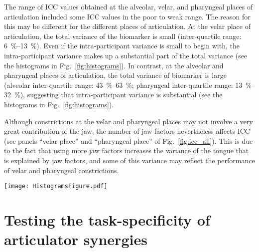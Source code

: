 \documentclass[reprint]{JASAnew}\usepackage[]{graphicx}\usepackage[]{color}
\begin{document}
The range of ICC values obtained at the alveolar, velar, and pharyngeal places of articulation included some ICC values in the poor to weak range. 
%
The reason for this may be different for the different places of articulation. 
%
At the velar place of articulation, the total variance of the biomarker is small
(inter-quartile range: \SIrange{6}{13}{\percent}). 
Even if the intra-participant variance is small to begin with, the intra-participant variance makes up a substantial part of the total variance (see the histograms in Fig.~\ref{fig:histograms}). 
%
In contrast, at the alveolar and pharyngeal places of articulation, the total variance of biomarker is large 
(alveolar inter-quartile range: \SIrange{43}{63}{\percent};
pharyngeal inter-quartile range: \SIrange{13}{32}{\percent}),
suggesting that intra-participant variance is substantial (see the histograms in Fig.~\ref{fig:histograms}). 

Although constrictions at the velar and pharyngeal places may not involve a very great contribution of the jaw, the number of jaw factors nevertheless affects ICC (see panels ``velar place'' and ``pharyngeal place'' of Fig.~\ref{fig:icc_all}). This is due to the fact that using more jaw factors increases the variance of the tongue that is explained by jaw factors, and some of this variance may reflect the performance of velar and pharyngeal constrictions. 


\begin{figure*}[t]

\texttt{[image: HistogramsFigure.pdf]}

\caption{\label{fig:histograms}(color online) 
Sample distribution of the jaw contributions to constrictions at the bilabial, alveolar, palatal, velar, and pharyngeal places of articulation. The quantity plotted is the percent of a constriction that was produced by the jaw.
A value of \SI{0}{\percent} indicates that lip or tongue motion produced the entire constriction, whereas a value of \SI{100}{\percent} indicates that jaw motion produced the entire constriction. 
Sample distribution by participant shown with a different color for each participant.}

\end{figure*}




\section{Testing the task-specificity of articulator synergies}
\label{sec:taskspec}
\end{document}
